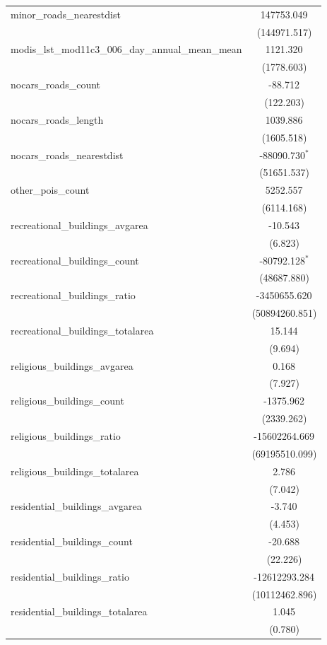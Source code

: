 \begin{table}[!htbp]
\begin{tabular}{@{\extracolsep{5pt}}lc}
 minor_roads_nearestdist & 147753.049$^{}$ \\
  & (144971.517) \\
 modis_lst_mod11c3_006_day_annual_mean_mean & 1121.320$^{}$ \\
  & (1778.603) \\
 nocars_roads_count & -88.712$^{}$ \\
  & (122.203) \\
 nocars_roads_length & 1039.886$^{}$ \\
  & (1605.518) \\
 nocars_roads_nearestdist & -88090.730$^{*}$ \\
  & (51651.537) \\
 other_pois_count & 5252.557$^{}$ \\
  & (6114.168) \\
 recreational_buildings_avgarea & -10.543$^{}$ \\
  & (6.823) \\
 recreational_buildings_count & -80792.128$^{*}$ \\
  & (48687.880) \\
 recreational_buildings_ratio & -3450655.620$^{}$ \\
  & (50894260.851) \\
 recreational_buildings_totalarea & 15.144$^{}$ \\
  & (9.694) \\
 religious_buildings_avgarea & 0.168$^{}$ \\
  & (7.927) \\
 religious_buildings_count & -1375.962$^{}$ \\
  & (2339.262) \\
 religious_buildings_ratio & -15602264.669$^{}$ \\
  & (69195510.099) \\
 religious_buildings_totalarea & 2.786$^{}$ \\
  & (7.042) \\
 residential_buildings_avgarea & -3.740$^{}$ \\
  & (4.453) \\
 residential_buildings_count & -20.688$^{}$ \\
  & (22.226) \\
 residential_buildings_ratio & -12612293.284$^{}$ \\
  & (10112462.896) \\
 residential_buildings_totalarea & 1.045$^{}$ \\
  & (0.780) \\

\end{tabular}
\end{table}
